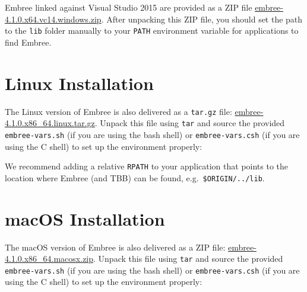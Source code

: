 Embree linked against Visual Studio 2015 are provided as a ZIP file
\href{https://github.com/embree/embree/releases/download/v4.1.0/embree-4.1.0.x64.vc14.windows.zip}{embree-4.1.0.x64.vc14.windows.zip}.
After unpacking this ZIP file, you should set the path to the
\texttt{lib} folder manually to your \texttt{PATH} environment variable
for applications to find Embree.

\section{Linux Installation}\label{linux-installation}

The Linux version of Embree is also delivered as a \texttt{tar.gz} file:
\href{https://github.com/embree/embree/releases/download/v4.1.0/embree-4.1.0.x86_64.linux.tar.gz}{embree-4.1.0.x86\_64.linux.tar.gz}.
Unpack this file using \texttt{tar} and source the provided
\texttt{embree-vars.sh} (if you are using the bash shell) or
\texttt{embree-vars.csh} (if you are using the C shell) to set up the
environment properly:

\begin{Shaded}
\begin{Highlighting}[]
\OperatorTok{{-}}
\OperatorTok{{-}}\OperatorTok{/}\OperatorTok{{-}}
\end{Highlighting}
\end{Shaded}

We recommend adding a relative \texttt{RPATH} to your application that
points to the location where Embree (and TBB) can be found,
e.g.~\texttt{\$ORIGIN/../lib}.

\section{macOS Installation}\label{macos-installation}

The macOS version of Embree is also delivered as a ZIP file:
\href{https://github.com/embree/embree/releases/download/v4.1.0/embree-4.1.0.x86_64.macosx.zip}{embree-4.1.0.x86\_64.macosx.zip}.
Unpack this file using \texttt{tar} and source the provided
\texttt{embree-vars.sh} (if you are using the bash shell) or
\texttt{embree-vars.csh} (if you are using the C shell) to set up the
environment properly:

\begin{Shaded}
\begin{Highlighting}[]
\OperatorTok{{-}}\OperatorTok{{-}}\OperatorTok{/}\OperatorTok{{-}}
\end{Highlighting}
\end{Shaded}

